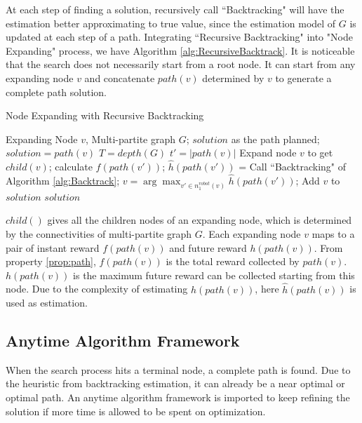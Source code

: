 \documentclass[12pt]{article}
\begin{document}
At each step of finding a solution, recursively call ``Backtracking" will have the estimation better approximating to true value, since the estimation model of $ G $ is updated at each step of a path. Integrating ``Recursive Backtracking" into "Node Expanding" process, we have Algorithm \ref{alg:RecursiveBacktrack}. It is noticeable that the search does not necessarily start from a root node. It can start from any expanding node $ v $ and concatenate $ path(v) $ determined by $ v $ to generate a complete path solution.

\begin{algorithm}
\caption{Node Expanding with Recursive Backtracking}
\label{alg:RecursiveBacktrack}
\begin{algorithmic}
\REQUIRE 
Expanding Node $ v $, Multi-partite graph $ G $;
\ENSURE $ solution $ as the path planned;
\STATE $ solution = path(v) $ 
\STATE $ T = depth(G) $
\STATE $ t' = \left| path(v) \right| $
\STATE  Expand node $ v $ to get $ child(v) $;
\STATE  calculate $ f(path(v')) $;
\STATE  $ \hat{h}(path(v')) $ = Call ``Backtracking" of Algorithm \ref{alg:Backtrack};
\ENDFOR
\STATE  $ v = \arg \max_{v' \in n^{robot}_{1}(v)} \hat{h}(path(v')) $;
\STATE  Add $ v $ to $ solution $
\ENDFOR 
\RETURN $ solution $
\end{algorithmic}
\end{algorithm}

$ child() $ gives all the children nodes of an expanding node, which is determined by the connectivities of multi-partite graph $ G $. Each expanding node $ v $ maps to a pair of instant reward $ f(path(v)) $ and future reward $ h(path(v)) $. From property \ref{prop:path}, $ f(path(v)) $ is the total reward collected by $ path(v) $. $ h(path(v)) $ is the maximum future reward can be collected starting from this node. Due to the complexity of estimating $ h(path(v)) $, here $ \hat{h}(path(v)) $ is used as estimation.

\subsection{Anytime Algorithm Framework}

When the search process hits a terminal node, a complete path is found. Due to the heuristic from backtracking estimation, it can already be a near optimal or optimal path. An anytime algorithm framework is imported to keep refining the solution if more time is allowed to be spent on optimization.
\end{document}
